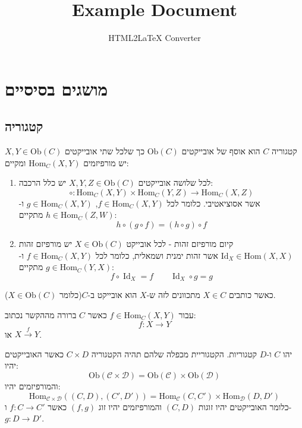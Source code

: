 \documentclass{tstextbook}
\begin{document}
\title{Example Document}
\author{HTML2LaTeX Converter}
\maketitle

\chapter{מושגים בסיסיים}

\section{קטגוריה}

\begin{definition}[קטגוריה]
קטגוריה \(C\) הוא אוסף של אובייקטים \(\mathrm{Ob}(C)\) כך שלכל שתי אובייקטים \(X,Y\in \mathrm{Ob}(C)\) יש מורפיזמים \(\mathrm{Hom}_{C}(X,Y)\) ומקיים:

  \begin{enumerate}
    \item לכל שלושה אובייקטים \(X,Y,Z\in \mathrm{Ob}(C)\) יש כלל הרכבה: 
$$\circ:{\mathrm{Hom}}_{C}(X,Y)\times{\mathrm{Hom}}_{C}(Y,Z)\to{\mathrm{Hom}}_{C}(X,Z)$$
אשר אסוציאטיבי. כלומר לכל \(f\in \mathrm{Hom}_{C}(X,Y)\), \(g \in \mathrm{Hom}_{C}(X,Y)\) ו-\(h \in \mathrm{Hom}_{C}(Z,W)\) מתקיים:
$$h\circ(g\circ f)=(h\circ g)\circ f$$


    \item קיום מורפיזם זהות - לכל אובייקט \(X \in \mathrm{Ob}(C)\) יש מורפיזם זהות \(\mathrm{Id}_{X}\in \mathrm{Hom}(X,X)\) אשר זהות ימנית ושמאלית, כלומר לכל \(f \in \mathrm{Hom}_{C}(X,Y)\) ו-\(g \in \mathrm{Hom}_{C}(Y,X)\) מתקיים: 
$$f\circ\operatorname{Id}_{X}=f\qquad \operatorname{Id}_{X}\circ g=g$$


  \end{enumerate}
\end{definition}
\begin{symbolize}
כאשר כותבים \(X \in C\) מתכוונים לזה ש-\(X\) הוא אובייקט ב-\(C\)(כלומר \(X \in \mathrm{Ob}(C)\)).

\end{symbolize}
\begin{symbolize}
עבור \(f \in \mathrm{Hom}_{C}(X,Y)\) כאשר \(C\) ברורה מההקשר נכתוב:
$$f:X\to Y$$
או \(X\xrightarrow{f}Y\).

\end{symbolize}
\begin{definition}
יהו \(C\) ו-\(D\) קטגוריות. הקטגוריית מכפלה שלהם תהיה הקטגוריה \(C \times D\) כאשר האובייקטים יהיו:
$$\mathrm{Ob}\left( \mathcal{C} \times \mathcal{D}  \right)=\mathrm{Ob}\left( \mathcal{C}  \right)\times \mathrm{Ob}\left( \mathcal{D}  \right)$$
והמורפיזמים יהיו:
$$\mathrm{Hom}_{\mathcal{C} \times \mathcal{D} }((C,D),(C',D')) =\mathrm{Hom}_{\mathcal{C} }(C,C')\times \mathrm{Hom}_{\mathcal{D} }(D,D')$$
כלומר האובייקטים יהיו זוגות \((C,D)\) והמורפיזמים יהיו זוג \((f,g)\) כאשר \(f:C\to C'\) ו-\(g:D\to D'\).

\end{definition}
\end{document}

